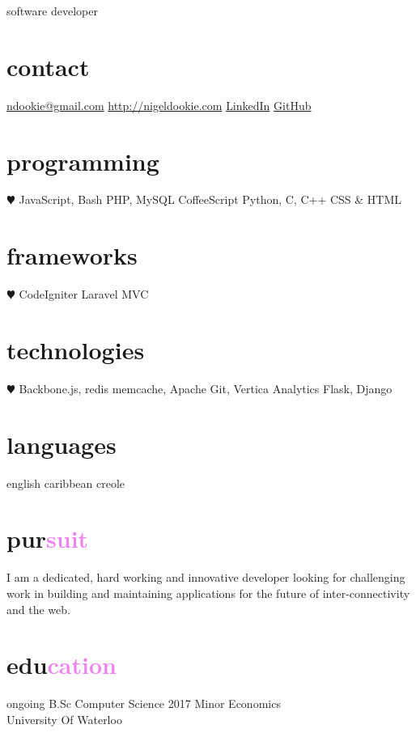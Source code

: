 \documentclass[]{friggeri-cv}
\begin{document}
       {software developer}


\begin{aside}
  \section{contact}
    \href{mailto:ndookie@gmail.com}{ndookie@gmail.com}
    \href{http://nigeldookie.com}{http://nigeldookie.com}
    \href{https://www.linkedin.com/in/nigel-dookie-88726440}{LinkedIn}
    \href{https://github.com/ndookie}{GitHub}
  \section{programming}
    {\color{red} $\varheartsuit$} JavaScript, Bash
    PHP, MySQL
    CoffeeScript
    Python, C, C++
    CSS \& HTML
  \section{frameworks}
    {\color{red} $\varheartsuit$} CodeIgniter
    Laravel
    MVC
  \section{technologies}
    {\color{red} $\varheartsuit$} Backbone.js, redis
    memcache, Apache
    Git, Vertica Analytics
    Flask, Django
  \section{languages}
    english
    caribbean creole
\end{aside}

\section{pur\textcolor{violet}{suit}}
    I am a dedicated, hard working and innovative developer looking for challenging work in building and maintaining applications for the future of inter-connectivity and the web.



\section{edu\textcolor{violet}{cation}}

\begin{entrylist}
  \entry
    {ongoing}
    {B.Sc {\normalfont Computer Science}}
    {2017}
    {Minor Economics \\University Of Waterloo}

\end{entrylist}
\end{document}
